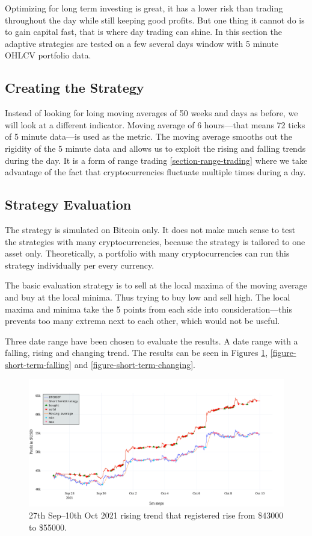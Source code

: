 Optimizing for long term investing is great, it has a lower risk than trading throughout the day while still keeping good profits. But one thing it cannot do is to gain capital fast, that is where day trading can shine. In this section the adaptive strategies are tested on a few several days window with 5 minute OHLCV portfolio data.

\subsection*{Creating the Strategy}
Instead of looking for loing moving averages of 50 weeks and days as before, we will look at a different indicator. Moving average of 6 hours---that means 72 ticks of 5 minute data---is used as the metric. The moving average smooths out the rigidity of the 5 minute data and allows us to exploit the rising and falling trends during the day. It is a form of range trading \ref{section-range-trading} where we take advantage of the fact that cryptocurrencies fluctuate multiple times during a day.

\subsection*{Strategy Evaluation}
The strategy is simulated on Bitcoin only. It does not make much sense to test the strategies with many cryptocurrencies, because the strategy is tailored to one asset only. Theoretically, a portfolio with many cryptocurrencies can run this strategy individually per every currency.

The basic evaluation strategy is to sell at the local maxima of the moving average and buy at the local minima. Thus trying to buy low and sell high. The local maxima and minima take the 5 points from each side into consideration---this prevents too many extrema next to each other, which would not be useful.

Three date range have been chosen to evaluate the results. A date range with a falling, rising and changing trend. The results can be seen in Figures \ref{figure-short-term-rising}, \ref{figure-short-term-falling} and \ref{figure-short-term-changing}.

\begin{figure}[!hbt]
    \centering
    \includegraphics[width=\columnwidth]{figures/short-term-rising.pdf}
    \caption{27th Sep--10th Oct 2021 rising trend that registered rise from \$43000 to \$55000.}
    \label{figure-short-term-rising}
\end{figure}

